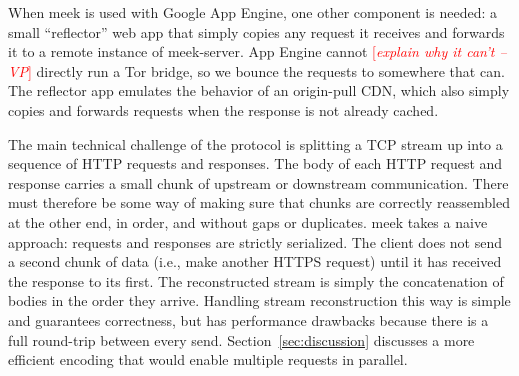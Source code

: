 \documentclass{sig-alternate}
\newcommand{\meekserver}{\mbox{meek-server}\xspace}
\newcommand{\meek}{meek\xspace}
\newcommand{\note}[1]{{\textcolor{red}{[\textit{#1}]}}}
\newcommand{\vp}[1]{\note{#1 --VP}}
\begin{document}
When \meek is used with Google App Engine, one other component is needed:
a small ``reflector'' web app that simply copies any request
it receives and forwards it to a remote instance of \meekserver.
App Engine cannot
\vp{explain why it can't}
directly run a Tor bridge,
so we bounce the requests to somewhere that can.
The reflector app emulates the behavior of an origin-pull CDN,
which also simply copies and forwards requests
when the response is not already cached.

The main technical challenge of the protocol is splitting a TCP stream up
into a sequence of HTTP requests and responses.
The body of each HTTP request and response carries
a small chunk of upstream or downstream communication.
There must therefore be some way of making sure that chunks
are correctly reassembled at the other end,
in order, and without gaps or duplicates.
\meek takes a naive approach: requests and responses are strictly serialized.
The client does not send a second chunk of data
(i.e., make another HTTPS request) until it has
received the response to its first.
The reconstructed stream is simply the concatenation
of bodies in the order they arrive.
Handling stream reconstruction this way is simple and guarantees correctness,
but has performance drawbacks because there is a full round-trip
between every send.
Section~\ref{sec:discussion} discusses a more efficient encoding
that would enable multiple requests in parallel.
\end{document}
